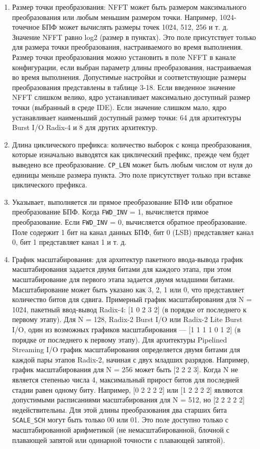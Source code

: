 \begin{enumerate}
	\item Размер точки преобразования: NFFT может быть размером максимального преобразования или любым меньшим размером точки. Например, 1024-точечное БПФ может вычислять размеры точек 1024, 512, 256 и т. д. Значение NFFT равно log2 (размер в пунктах). Это поле присутствует только для размера точки преобразования, настраиваемого во время выполнения.
	Размер точки преобразования можно установить в поле NFFT в канале конфигурации, если выбран параметр длины преобразования, настраиваемая во время выполнения. Допустимые настройки и соответствующие размеры преобразования представлены в таблице 3-18. Если введенное значение NFFT слишком велико, ядро устанавливает максимально доступный размер точки (выбранный в среде IDE). Если значение слишком мало, ядро устанавливает наименьший доступный размер точки: 64 для архитектуры Burst I/O Radix-4 и 8 для других архитектур.
	\item Длина циклического префикса: количество выборок с конца преобразования, которые изначально выводятся как циклический префикс, прежде чем будет выведено все преобразование. \verb|CP_LEN| может быть любым числом от нуля до единицы меньше размера пункта. Это поле присутствует только при вставке циклического префикса.
	\item Указывает, выполняется ли прямое преобразование БПФ или обратное преобразование БПФ. Когда \verb|FWD_INV| = 1, вычисляется прямое преобразование. Если \verb|FWD_INV| = 0, вычисляется обратное преобразование. Поле содержит 1 бит на канал данных БПФ, бит 0 (LSB) представляет канал 0, бит 1 представляет канал 1 и т. д.
	\item График масштабирования: для архитектур пакетного ввода-вывода график масштабирования задается двумя битами для каждого этапа, при этом масштабирование для первого этапа задается двумя младшими битами. Масштабирование может быть указано как 3, 2, 1 или 0, что представляет количество битов для сдвига. Примерный график масштабирования для N = 1024, пакетный ввод-вывод Radix-4: [1 0 2 3 2] (в порядке от последнего к первому этапу). Для N = 128, Radix-2 Burst I/O или Radix-2 Lite Burst I/O, один из возможных графиков масштабирования — [1 1 1 1 0 1 2] (в порядке от последнего к первому этапу). Для архитектуры Pipelined Streaming I/O график масштабирования определяется двумя битами для каждой пары этапов Radix-2, начиная с двух младших разрядов. Например, график масштабирования для N = 256 может быть [2 2 2 3]. Когда N не является степенью числа 4, максимальный прирост битов для последней стадии равен одному биту. Например, [0 2 2 2 2] или [1 2 2 2 2] являются допустимыми расписаниями масштабирования для N = 512, но [2 2 2 2 2] недействительны. Для этой длины преобразования два старших бита \verb|SCALE_SCH| могут быть только 00 или 01. Это поле доступно только с масштабированной арифметикой (не немасштабированной, блочной с плавающей запятой или одинарной точности с плавающей запятой).

\end{enumerate} 

